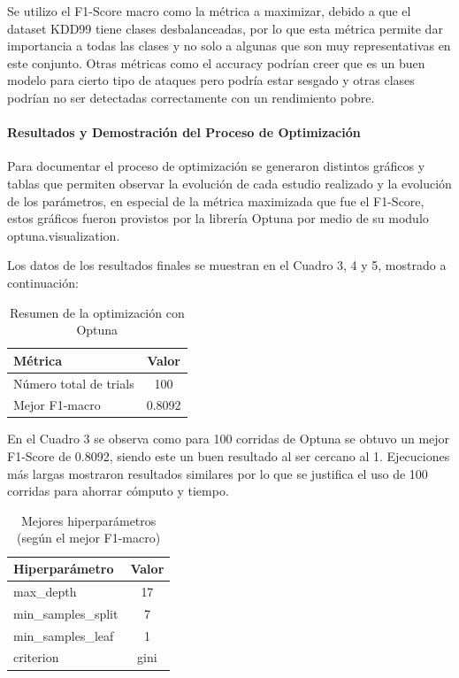 \documentclass[12pt,a4paper]{article}
\begin{document}
Se utilizo el F1-Score macro como la métrica a maximizar, debido a que el dataset KDD99 tiene clases desbalanceadas,
por lo que esta métrica permite dar importancia a todas las clases y no solo a algunas que son muy representativas
en este conjunto. Otras métricas como el accuracy podrían creer que es un buen modelo para cierto tipo de ataques
pero podría estar sesgado y otras clases podrían no ser detectadas correctamente con un rendimiento pobre.

\paragraph{Resultados y Demostración del Proceso de Optimización}

Para documentar el proceso de optimización se generaron distintos gráficos y tablas que permiten observar la evolución de cada estudio
realizado y la evolución de los parámetros, en especial de la métrica maximizada que fue el F1-Score, estos
gráficos fueron provistos por la librería Optuna por medio de su modulo optuna.visualization.

Los datos de los resultados finales se muestran en el Cuadro 3, 4 y 5, mostrado a continuación:

\begin{table}[htbp]
  \centering
  \begin{tabular}{l c}
    \hline
    Métrica & Valor \\
    \hline
    Número total de trials & 100 \\
    Mejor F1-macro & 0.8092 \\
    \hline
  \end{tabular}
  \caption{Resumen de la optimización con Optuna}
  \label{tab:optuna_resumen}
\end{table}

En el Cuadro 3 se observa como para 100 corridas de Optuna se obtuvo un mejor F1-Score de 0.8092,
siendo este un buen resultado al ser cercano al 1. Ejecuciones más largas mostraron resultados similares
por lo que se justifica el uso de 100 corridas para ahorrar cómputo y tiempo.

\begin{table}[htbp]
  \centering
  \begin{tabular}{l c}
    \hline
    Hiperparámetro & Valor \\
    \hline
    max\_depth & 17 \\
    min\_samples\_split & 7 \\
    min\_samples\_leaf & 1 \\
    criterion & gini \\
    \hline
  \end{tabular}
  \caption{Mejores hiperparámetros (según el mejor F1-macro)}
  \label{tab:optuna_mejores_hparams}
\end{table}
\end{document}
